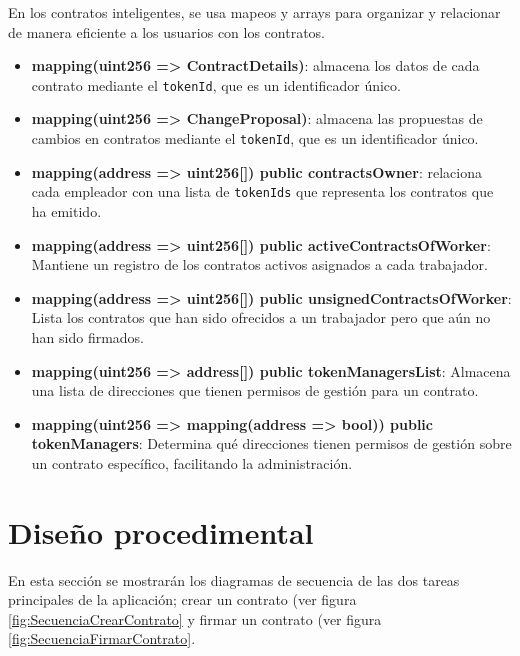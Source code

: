 En los contratos inteligentes, se usa mapeos y arrays para organizar y relacionar de manera eficiente a los usuarios con los contratos.

\begin{itemize}

\item \textbf{mapping(uint256 => ContractDetails)}: almacena los datos de cada contrato mediante el \texttt{tokenId}, que es un identificador único.

\item \textbf{mapping(uint256 => ChangeProposal)}: almacena las propuestas de cambios en contratos mediante el \texttt{tokenId}, que es un identificador único.

\item \textbf{mapping(address => uint256[]) public contractsOwner}: relaciona cada empleador con una lista de \texttt{tokenIds} que representa los contratos que ha emitido.

\item \textbf{mapping(address => uint256[]) public activeContractsOfWorker}: Mantiene un registro de los contratos activos asignados a cada trabajador.

\item \textbf{mapping(address => uint256[]) public unsignedContractsOfWorker}: Lista los contratos que han sido ofrecidos a un trabajador pero que aún no han sido firmados.

\item \textbf{mapping(uint256 => address[]) public tokenManagersList}: Almacena una lista de direcciones que tienen permisos de gestión para un contrato.

\item \textbf{mapping(uint256 => mapping(address => bool)) public tokenManagers}: Determina qué direcciones tienen permisos de gestión sobre un contrato específico, facilitando la administración.

\end{itemize}


\section{Diseño procedimental}

En esta sección se mostrarán los diagramas de secuencia de las dos tareas principales de la aplicación; crear un contrato (ver figura \ref{fig:SecuenciaCrearContrato} y firmar un contrato (ver figura \ref{fig:SecuenciaFirmarContrato}.

